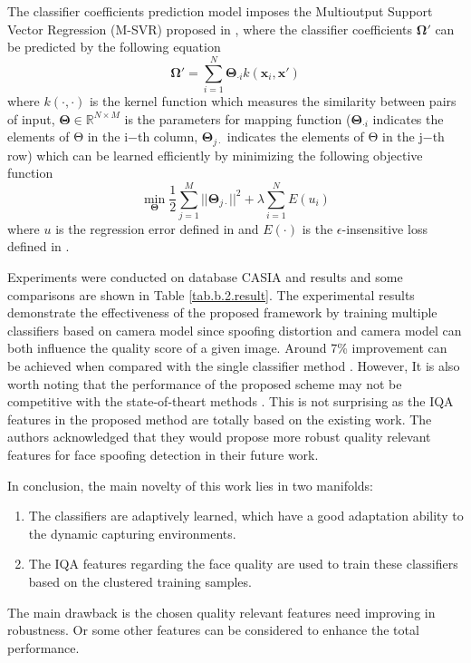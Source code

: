 \documentclass[journal]{IEEEtran}
\begin{document}
The classifier coefficients prediction model imposes the Multioutput Support Vector Regression (M-SVR) proposed in \cite{tuia2011multioutput}, where the classifier coefficients $\mathbf{\Omega}'$ can be predicted by the following equation
\begin{equation}
    \mathbf{\Omega}' = \sum\limits_{i = 1} ^ N \mathbf{\Theta}_{\cdot i}k(\mathbf{x}_i,\mathbf{x}')
\end{equation}
where $k(\cdot,\cdot)$ is the kernel function which measures the similarity between pairs of input, $\mathbf{\Theta} \in \mathbb{R}^{N\times M}$ is the parameters for mapping function ($\mathbf{\Theta}_{\cdot i}$ indicates the elements of Θ in the i−th column, $\mathbf{\Theta}_{j\cdot}$ indicates the elements of Θ in the j−th row) which can be learned efficiently by minimizing the following objective function
\begin{equation}
    \min\limits_\mathbf{\Theta}\frac{1}{2}\sum\limits_{j=1}^M||\mathbf{\Theta}_{j\cdot}||^2+\lambda\sum\limits_{i=1}^NE(u_i)
\end{equation}
where $u$ is the regression error defined in \cite{tuia2011multioutput} and $E(\cdot)$ is the $\epsilon$-insensitive loss defined in \cite{tuia2011multioutput}.

Experiments were conducted on database CASIA \cite{zhang2012face} and results and some comparisons are shown in Table \ref{tab.b.2.result}. The experimental results demonstrate the effectiveness of the proposed framework by training multiple classifiers based on camera model since spoofing distortion and camera model can both influence the quality score of a given image. Around 7\% improvement can be achieved when compared with the single classifier method \cite{galbally2014image}. However, It is also worth noting that the performance of the proposed scheme may not be competitive with the state-of-theart methods \cite{maatta2011face}\cite{wen2015face}. This is not surprising as the IQA features in the proposed method are totally based on the existing work. The authors acknowledged that they would propose more robust quality relevant features for face spoofing detection in their future work.

In conclusion, the main novelty of this work lies in two manifolds:
\begin{enumerate}
\item The classifiers are adaptively learned, which have a good adaptation ability to the dynamic capturing environments.
\item  The IQA features regarding the face quality are used to train these classifiers based on the clustered training samples.
\end{enumerate}
The main drawback is the chosen quality relevant features need improving in robustness. Or some other features can be considered to enhance the total performance.
\end{document}
